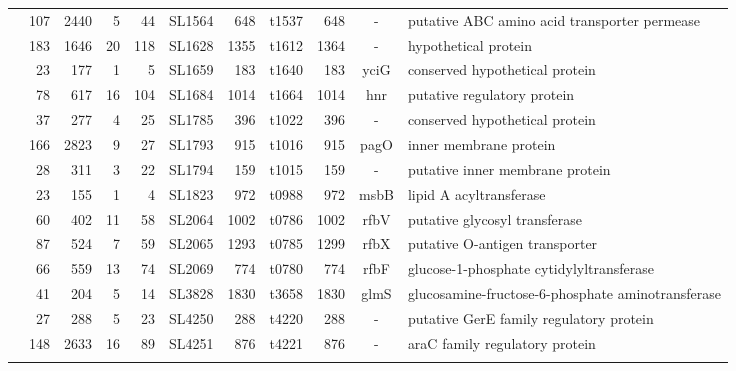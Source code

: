 \begin{landscape}
\begin{longtable}{ r
    				r
				r
				r
				r
				l
				r
				r
				r
				c
				p{1.8in}}
   &\cellcolor{Gray}107   &\cellcolor{Gray}2440  &\cellcolor{Gray}5     &\cellcolor{Gray}44    &\cellcolor{Gray}SL1564 &\cellcolor{Gray}648   &\cellcolor{Gray}t1537 &\cellcolor{Gray}648   &\cellcolor{Gray}-     &\cellcolor{Gray}putative ABC amino acid transporter permease \\
   &\cellcolor{Gray}183   &\cellcolor{Gray}1646  &\cellcolor{Gray}20    &\cellcolor{Gray}118   &\cellcolor{Gray}SL1628 &\cellcolor{Gray}1355  &\cellcolor{Gray}t1612 &\cellcolor{Gray}1364  &\cellcolor{Gray}-     &\cellcolor{Gray}hypothetical protein \\
   &\cellcolor{Gray}23    &\cellcolor{Gray}177   &\cellcolor{Gray}1     &\cellcolor{Gray}5     &\cellcolor{Gray}SL1659 &\cellcolor{Gray}183   &\cellcolor{Gray}t1640 & \cellcolor{Gray}183   &\cellcolor{Gray}yciG  &\cellcolor{Gray}conserved hypothetical protein \\
   & 78    & 617   & 16    & 104   & SL1684 & 1014  & t1664 & 1014  & hnr   & putative regulatory protein \\
   &\cellcolor{Gray}37    &\cellcolor{Gray}277   &\cellcolor{Gray}4     &\cellcolor{Gray}25    &\cellcolor{Gray}SL1785 &\cellcolor{Gray}396   &\cellcolor{Gray}t1022 &\cellcolor{Gray}396   &\cellcolor{Gray}-     &\cellcolor{Gray}conserved hypothetical protein \\
   &\cellcolor{Gray}166   &\cellcolor{Gray}2823  &\cellcolor{Gray}9     &\cellcolor{Gray}27    &\cellcolor{Gray}SL1793 &\cellcolor{Gray}915   &\cellcolor{Gray}t1016 &\cellcolor{Gray}915   &\cellcolor{Gray}pagO  &\cellcolor{Gray}inner membrane protein \\
   &\cellcolor{Gray}28    &\cellcolor{Gray}311   &\cellcolor{Gray}3     &\cellcolor{Gray}22    &\cellcolor{Gray}SL1794 &\cellcolor{Gray}159   &\cellcolor{Gray}t1015 & \cellcolor{Gray}159   &\cellcolor{Gray}-     &\cellcolor{Gray}putative inner membrane protein \\
   & 23    & 155   & 1     & 4     & SL1823 & 972   & t0988 & 972   & msbB  & lipid A acyltransferase \\
   & 60    & 402   & 11    & 58    & SL2064 & 1002  & t0786 & 1002  & rfbV  & putative glycosyl transferase \\
   & 87    & 524   & 7     & 59    & SL2065 & 1293  & t0785 & 1299  & rfbX  & putative O-antigen transporter \\
   & 66    & 559   & 13    & 74    & SL2069 & 774   & t0780 & 774   & rfbF  & glucose-1-phosphate cytidylyltransferase \\
   & 41    & 204   & 5     & 14    & SL3828 & 1830  & t3658 & 1830  & glmS  & glucosamine-fructose-6-phosphate aminotransferase \\
   & 27    & 288   & 5     & 23    & SL4250 & 288   & t4220 & 288   & -     & putative GerE family regulatory protein \\
   & 148   & 2633  & 16    & 89    & SL4251 & 876   & t4221 & 876   & -     & araC family regulatory protein \\
    \bottomrule
    \label{tab:stm_uniq}%
    \end{longtable}%
\end{landscape}%
\endgroup

